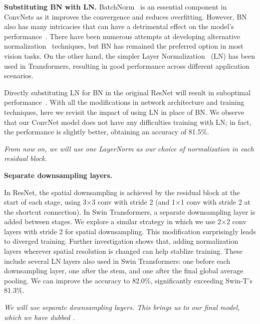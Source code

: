 \documentclass[10pt,twocolumn,letterpaper]{article}
\renewcommand{\paragraph}[1]{\vspace{1.25mm}\noindent\textbf{#1}}
\begin{document}
\paragraph{Substituting BN with LN.}
BatchNorm~\cite{Ioffe2017} is an essential component in ConvNets as it improves the convergence and reduces overfitting. However, BN also has many intricacies that can have a detrimental effect on the model's performance~\cite{wu2021rethinking}. There have been numerous attempts at developing alternative normalization~\cite{Salimans2016,Ulyanov2016,Wu2018} techniques, but BN has remained the preferred option in most vision tasks.
On the other hand, the simpler Layer Normalization~\cite{Ba2016} (LN) has been used in Transformers, resulting in good performance across different application scenarios.

Directly substituting LN for BN in the original ResNet will result in suboptimal performance~\cite{Wu2018}. With all the modifications in network architecture and training techniques, here we revisit the impact of using LN in place of BN. We observe that our ConvNet model does not have any difficulties training with LN; in fact, the performance is slightly better, obtaining an accuracy of 81.5\%.


\textit{From now on, we will use one LayerNorm as our choice of normalization in each residual block.}
 
\paragraph{Separate downsampling layers.}

In ResNet, the spatial downsampling is achieved by the residual block at the start of each stage, using 3$\times$3 conv with stride 2 (and 1$\times$1 conv with stride 2 at the shortcut connection). In Swin Transformers, a separate downsampling layer is added between stages. We explore a similar strategy in which we use 2$\times$2 conv layers with stride 2 for spatial downsampling. This modification surprisingly leads to diverged training. Further investigation shows that, adding normalization layers wherever spatial resolution is changed can help stablize training. These include several LN layers also used in Swin Transformers: one before each downsampling layer, one after the stem, and one after the final global average pooling. 
We can improve the accuracy to 82.0\%, significantly exceeding Swin-T's 81.3\%.


\textit{
We will use separate downsampling layers. This brings us to our final model, which we have dubbed \cnn{}.}
\end{document}
